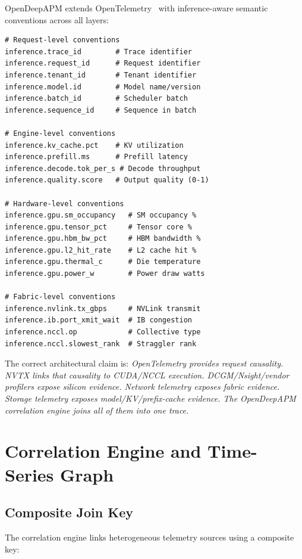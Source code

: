 \documentclass[conference,10pt]{IEEEtran}
\begin{document}
OpenDeepAPM extends OpenTelemetry~\cite{otel2025gpu} with inference-aware semantic conventions across all layers:

\begin{lstlisting}
# Request-level conventions
inference.trace_id        # Trace identifier
inference.request_id      # Request identifier
inference.tenant_id       # Tenant identifier
inference.model.id        # Model name/version
inference.batch_id        # Scheduler batch
inference.sequence_id     # Sequence in batch

# Engine-level conventions
inference.kv_cache.pct    # KV utilization
inference.prefill.ms      # Prefill latency
inference.decode.tok_per_s # Decode throughput
inference.quality.score   # Output quality (0-1)

# Hardware-level conventions
inference.gpu.sm_occupancy   # SM occupancy %
inference.gpu.tensor_pct     # Tensor core %
inference.gpu.hbm_bw_pct     # HBM bandwidth %
inference.gpu.l2_hit_rate    # L2 cache hit %
inference.gpu.thermal_c      # Die temperature
inference.gpu.power_w        # Power draw watts

# Fabric-level conventions
inference.nvlink.tx_gbps     # NVLink transmit
inference.ib.port_xmit_wait  # IB congestion
inference.nccl.op            # Collective type
inference.nccl.slowest_rank  # Straggler rank
\end{lstlisting}

The correct architectural claim is: \emph{OpenTelemetry provides request causality. NVTX links that causality to CUDA/NCCL execution. DCGM/Nsight/vendor profilers expose silicon evidence. Network telemetry exposes fabric evidence. Storage telemetry exposes model/KV/prefix-cache evidence. The OpenDeepAPM correlation engine joins all of them into one trace.}

\section{Correlation Engine and Time-Series Graph}
\label{sec:correlation}

\subsection{Composite Join Key}

The correlation engine links heterogeneous telemetry sources using a composite key:
\end{document}
